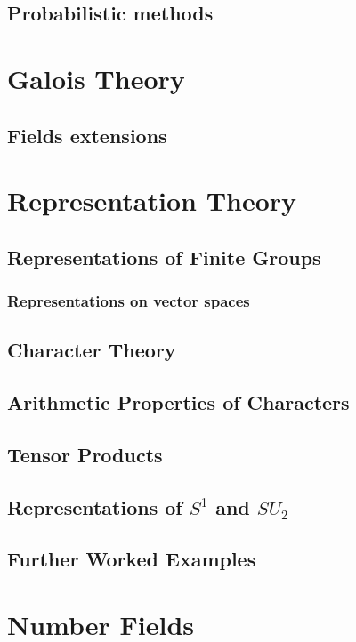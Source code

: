 \documentclass[12pt]{book}
\theoremstyle{definition}
\theoremstyle{remark}
\begin{document}
		\section{Probabilistic methods}
	\chapter{Galois Theory}
		\section{Fields extensions}
	\chapter{Representation Theory}
		\section{Representations of Finite Groups}
			\subsection{Representations on vector spaces}
		
		\section{Character Theory}
		
		\section{Arithmetic Properties of Characters}
		
		\section{Tensor Products}
		
		\section{Representations of $S^1$ and $SU_2$}
		
		\section{Further Worked Examples}
		
	\chapter{Number Fields}
\end{document}
